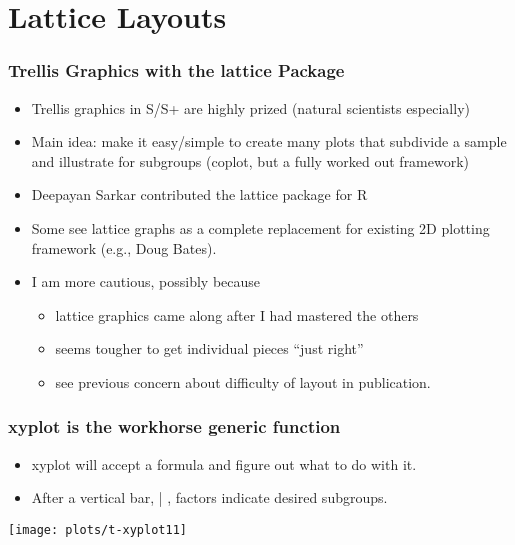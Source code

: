 \documentclass[11pt,english]{beamer}
\begin{document}
\section{Lattice Layouts}

\begin{frame}
  \frametitle{Trellis Graphics with the lattice Package}

  \begin{itemize}
  \item Trellis graphics in S/S+ are highly prized (natural scientists
    especially)
  \item Main idea: make it easy/simple to create many plots that
    subdivide a sample and illustrate for subgroups (coplot, but a
    fully worked out framework)
  \item Deepayan Sarkar contributed the lattice package for R
  \item Some see lattice graphs as a complete replacement for
    existing 2D plotting framework (e.g., Doug Bates).
  \item I am more cautious, possibly because
    \begin{itemize}
    \item lattice graphics came along after I had mastered the others
    \item seems tougher to get individual pieces ``just right''
    \item see previous concern about difficulty of layout in publication.
    \end{itemize}
  \end{itemize}
\end{frame}


\begin{frame}
  \frametitle{xyplot is the workhorse generic function}
  \begin{itemize}
    \item xyplot will accept a formula and figure out what to do with it.
    \item After a vertical bar, | , factors indicate desired subgroups.


  \end{itemize}

\end{frame}


\begin{frame}[containsverbatim]






\texttt{[image: plots/t-xyplot11]}

\end{frame}
\end{document}
